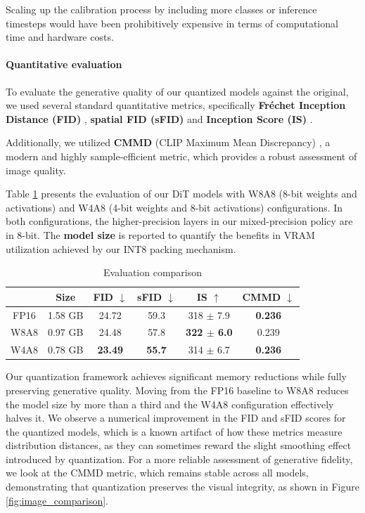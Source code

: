 \documentclass{article}
\begin{document}
Scaling up the calibration process by including more classes or inference timesteps would have been prohibitively expensive in terms of computational time and hardware costs.

\paragraph{Quantitative evaluation}

To evaluate the generative quality of our quantized models against the original, we used several standard quantitative metrics, specifically \textbf{Fréchet Inception Distance (FID)} \cite{heusel2018ganstrainedtimescaleupdate}, \textbf{spatial FID (sFID)} \cite{nash2021generatingimagessparserepresentations} and \textbf{Inception Score (IS)} \cite{barratt2018noteinceptionscore}.

Additionally, we utilized \textbf{CMMD} (CLIP Maximum Mean Discrepancy) \cite{jayasumana2024rethinkingfidbetterevaluation}, a modern and highly sample-efficient metric, which provides a robust assessment of image quality.

Table \ref{tab:evaluation} presents the evaluation of our DiT models with W8A8 (8-bit weights and activations) and W4A8 (4-bit weights and 8-bit activations) configurations.
In both configurations, the higher-precision layers in our mixed-precision policy are in 8-bit.
The \textbf{model size} is reported to quantify the benefits in VRAM utilization achieved by our INT8 packing mechanism.

\begin{table}[h!]
    \caption{Evaluation comparison}
    \label{tab:evaluation}
    \centering
    \begin{small}
        \begin{tabular}{c|ccccc}
            \toprule
            &Size&FID $\downarrow$&sFID $\downarrow$&IS $\uparrow$&CMMD $\downarrow$\\
            \midrule
            FP16&1.58 GB&24.72&59.3&318 $\pm$ 7.9&\textbf{0.236}\\
            W8A8&0.97 GB&24.48&57.8&\textbf{322 $\pm$ 6.0}&0.239\\
            W4A8&0.78 GB&\textbf{23.49}&\textbf{55.7}&314 $\pm$ 6.7&\textbf{0.236}\\
            \bottomrule
        \end{tabular}
    \end{small}
\end{table}

Our quantization framework achieves significant memory reductions while fully preserving generative quality. Moving from the FP16 baseline to W8A8 reduces the model size by more than a third and the W4A8 configuration effectively halves it.
We observe a numerical improvement in the FID and sFID scores for the quantized models, which is a known artifact of how these metrics measure distribution distances, as they can sometimes reward the slight smoothing effect introduced by quantization.
For a more reliable assessment of generative fidelity, we look at the CMMD metric, which remains stable across all models, demonstrating that quantization preserves the visual integrity, as shown in Figure \ref{fig:image_comparison}.
\end{document}
